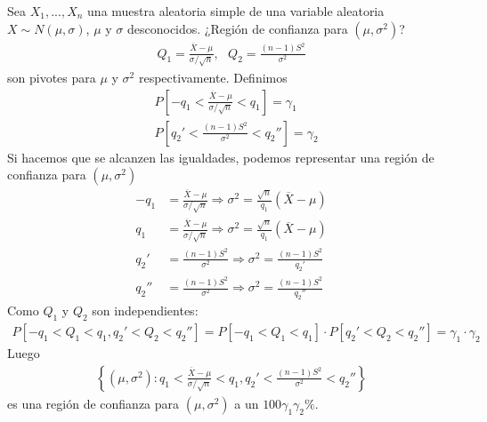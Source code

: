 \begin{ejemplo}
    Sea $X_1,...,X_n$ una muestra aleatoria simple de una variable aleatoria $X \sim N(\mu,\sigma)$, $\mu$ y $\sigma$ desconocidos. ¿Región de confianza para $(\mu,\sigma^2)$?
    \begin{align*}
        Q_1 = \frac{\overline{X} - \mu}{\sigma/\sqrt{n}}, \ \ \ Q_2 = \frac{(n-1)S^2}{\sigma^2}
    \end{align*}
    son pivotes para $\mu$ y $\sigma^2$ respectivamente. Definimos
    \begin{align*}
         & P\left[-q_1 < \frac{\overline{X} - \mu}{\sigma/\sqrt{n}} < q_1\right] = \gamma_1 \\
         & P\left[q_2' < \frac{(n-1)S^2}{\sigma^2} < q_2''\right] = \gamma_2
    \end{align*}
    Si hacemos que se alcanzen las igualdades, podemos representar una región de confianza para $(\mu,\sigma^2)$
    \begin{align*}
        -q_1  & =  \frac{\overline{X} - \mu}{\sigma/\sqrt{n}} \Longrightarrow \sigma^2 = \frac{\sqrt{n}}{q_1}(\overline{X} - \mu) \\
        q_1   & = \frac{\overline{X} - \mu}{\sigma/\sqrt{n}} \Longrightarrow \sigma^2 = \frac{\sqrt{n}}{q_1}(\overline{X} - \mu)  \\
        q_2'  & = \frac{(n-1)S^2}{\sigma^2} \Longrightarrow \sigma^2 = \frac{(n-1)S^2}{q_2'}                                      \\
        q_2'' & = \frac{(n-1)S^2}{\sigma^2} \Longrightarrow \sigma^2 = \frac{(n-1)S^2}{q_2''}
    \end{align*}
    Como $Q_1$ y $Q_2$ son independientes:
    \begin{align*}
        P[-q_1 < Q_1 < q_1, q_2' < Q_2 < q_2''] = P[-q_1 < Q_1 < q_1] \cdot P[ q_2' < Q_2 < q_2''] = \gamma_1 \cdot \gamma_2
    \end{align*}
    Luego
    \begin{align*}
        \left\{  (\mu,\sigma^2) : q_1 < \frac{\overline{X} - \mu}{\sigma/\sqrt{n}}< q_1, q_2' < \frac{(n-1)S^2}{\sigma^2} < q_2''\right\}
    \end{align*}
    es una región de confianza para $(\mu,\sigma^2)$ a un $100\gamma_1 \gamma_2 \%$.
\end{ejemplo}

